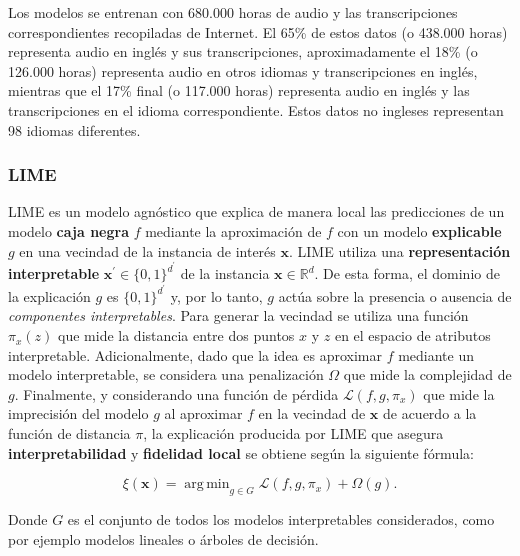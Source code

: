 \documentclass[conference]{IEEEtran}
\DeclareMathOperator*{\argmin}{arg\,min}
\begin{document}
Los modelos se entrenan con 680.000 horas de audio y las transcripciones correspondientes recopiladas de Internet. El 65\% de estos datos (o 438.000 horas) representa audio en inglés y sus transcripciones, aproximadamente el 18\% (o 126.000 horas) representa audio en otros idiomas y transcripciones en inglés, mientras que el 17\% final (o 117.000 horas) representa audio en inglés y las transcripciones en el idioma correspondiente. Estos datos no ingleses representan 98 idiomas diferentes.

\subsubsection{LIME}
LIME \cite{ribeiro2016why} es un modelo agnóstico que explica de manera local las predicciones de un modelo \textbf{caja negra} $f$ mediante la aproximación de $f$ con un modelo \textbf{explicable} $g$ en una vecindad de la instancia de interés $\bm{x}$. LIME utiliza una \textbf{representación interpretable} $\bm{x^\prime} \in \{0,1\}^{d^\prime}$ de la instancia $\bm{x} \in \mathbb{R}^d$. De esta forma, el dominio de la explicación $g$ es $\{0,1\}^{d^\prime}$ y, por lo tanto, $g$ actúa sobre la presencia o ausencia de \textit{componentes interpretables}. Para generar la vecindad se utiliza una función $\pi_x(z)$ que mide la distancia entre dos puntos $x$ y $z$ en el espacio de atributos interpretable. Adicionalmente, dado que la idea es aproximar $f$ mediante un modelo interpretable, se considera una penalización $\Omega$ que mide la complejidad de $g$. Finalmente, y considerando una función de pérdida $\mathcal{L}(f, g, \pi_x)$ que mide la imprecisión del modelo $g$ al aproximar $f$ en la vecindad de $\bm{x}$ de acuerdo a la función de distancia $\pi$, la explicación producida por LIME que asegura \textbf{interpretabilidad} y \textbf{fidelidad local} se obtiene según la siguiente fórmula:

\begin{equation}
    \xi(\bm{x}) = \argmin_{g \in G} \mathcal{L}(f, g, \pi_x) + \Omega(g).
\end{equation}

Donde $G$ es el conjunto de todos los modelos interpretables considerados, como por ejemplo modelos lineales o árboles de decisión.
\end{document}
